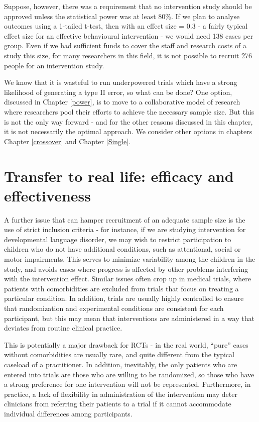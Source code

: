 \documentclass{krantz}
\begin{document}
Suppose, however, there was a requirement that no intervention study should be approved unless the statistical power was at least 80\%. If we plan to analyse outcomes using a 1-tailed t-test, then with an effect size = 0.3 - a fairly typical effect size for an effective behavioural intervention - we would need 138 cases per group. Even if we had sufficient funds to cover the staff and research costs of a study this size, for many researchers in this field, it is not possible to recruit 276 people for an intervention study.

We know that it is wasteful to run underpowered trials which have a strong likelihood of generating a type II error, so what can be done? One option, discussed in Chapter \ref{power}, is to move to a collaborative model of research where researchers pool their efforts to achieve the necessary sample size. But this is not the only way forward - and for the other reasons discussed in this chapter, it is not necessarily the optimal approach. We consider other options in chapters Chapter \ref{crossover} and Chapter \ref{Single}.

\hypertarget{transfer-to-real-life-efficacy-and-effectiveness}{%
\section{Transfer to real life: efficacy and effectiveness}\label{transfer-to-real-life-efficacy-and-effectiveness}}

A further issue that can hamper recruitment of an adequate sample size is the use of strict inclusion criteria - for instance, if we are studying intervention for developmental language disorder, we may wish to restrict participation to children who do not have additional conditions, such as attentional, social or motor impairments. This serves to minimize variability among the children in the study, and avoids cases where progress is affected by other problems interfering with the intervention effect. Similar issues often crop up in medical trials, where patients with comorbidities are excluded from trials that focus on treating a particular condition. In addition, trials are usually highly controlled to ensure that randomization and experimental conditions are consistent for each participant, but this may mean that interventions are administered in a way that deviates from routine clinical practice.

This is potentially a major drawback for RCTs - in the real world, ``pure'' cases without comorbidities are usually rare, and quite different from the typical caseload of a practitioner. In addition, inevitably, the only patients who are entered into trials are those who are willing to be randomized, so those who have a strong preference for one intervention will not be represented. Furthermore, in practice, a lack of flexibility in administration of the intervention may deter clinicians from referring their patients to a trial if it cannot accommodate individual differences among participants.
\end{document}
